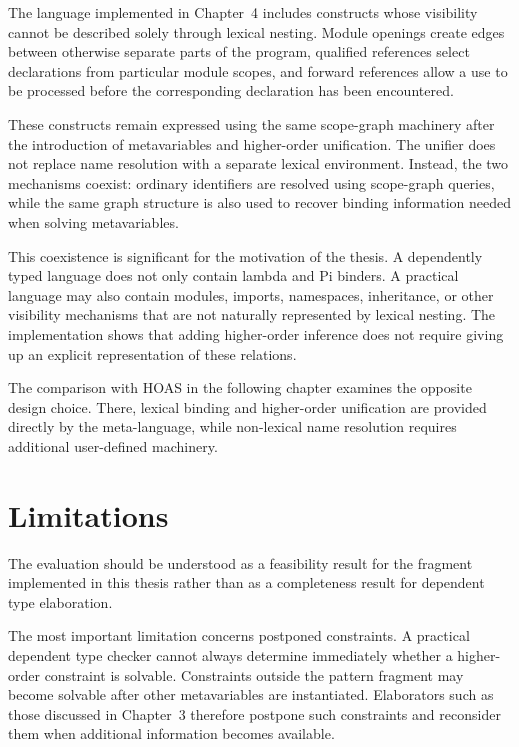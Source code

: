 The language implemented in Chapter~4 includes constructs whose visibility
cannot be described solely through lexical nesting. Module openings create
edges between otherwise separate parts of the program, qualified references
select declarations from particular module scopes, and forward references
allow a use to be processed before the corresponding declaration has been
encountered.

These constructs remain expressed using the same scope-graph machinery after
the introduction of metavariables and higher-order unification. The unifier
does not replace name resolution with a separate lexical environment.
Instead, the two mechanisms coexist: ordinary identifiers are resolved using
scope-graph queries, while the same graph structure is also used to recover
binding information needed when solving metavariables.

This coexistence is significant for the motivation of the thesis. A
dependently typed language does not only contain lambda and Pi binders. A
practical language may also contain modules, imports, namespaces, inheritance,
or other visibility mechanisms that are not naturally represented by lexical
nesting. The implementation shows that adding higher-order inference does not
require giving up an explicit representation of these relations.

The comparison with HOAS in the following chapter examines the opposite design
choice. There, lexical binding and higher-order unification are provided
directly by the meta-language, while non-lexical name resolution requires
additional user-defined machinery.

\section{Limitations}
\label{sec:evaluation-limitations}

The evaluation should be understood as a feasibility result for the fragment
implemented in this thesis rather than as a completeness result for dependent
type elaboration.

The most important limitation concerns postponed constraints. A practical
dependent type checker cannot always determine immediately whether a
higher-order constraint is solvable. Constraints outside the pattern fragment
may become solvable after other metavariables are instantiated. Elaborators
such as those discussed in Chapter~3 therefore postpone such constraints and
reconsider them when additional information becomes available.

